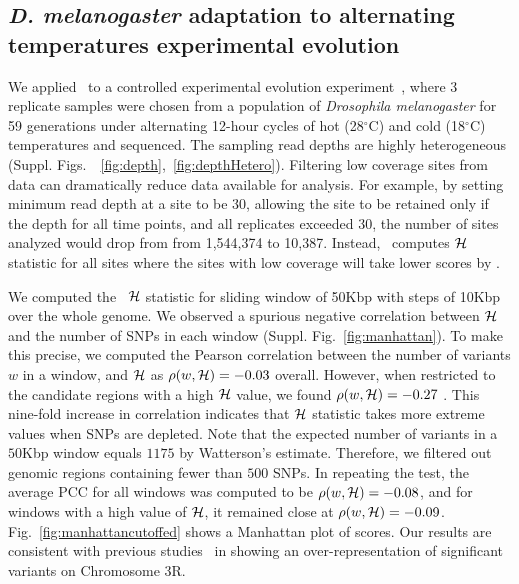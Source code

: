 \documentclass[11pt]{article}
\def\comale{\text{{\sc Comale}}}
\def\data{\emph{D. melanogaster} adaptation to alternating temperatures 
experimental evolution}
\begin{document}
\subsection{\data}\label{sec:dmel}
We applied \comale\ to a controlled experimental evolution
experiment~\cite{orozco2012adaptation}, where $3$ replicate samples
were chosen from a population of \emph{Drosophila melanogaster} for 59
generations under alternating 12-hour cycles of hot (28$^{\circ}$C)
and cold (18$^{\circ}$C) temperatures and sequenced. The sampling read
depths are highly heterogeneous
(Suppl. Figs.~~\ref{fig:depth},~\ref{fig:depthHetero}). Filtering low
coverage sites from data can dramatically reduce data available for
analysis. For example, by setting minimum read depth at a site to be
$30$, allowing the site to be retained only if the depth for all time
points, and all replicates exceeded $30$, the number of sites analyzed
would drop from from 1,544,374 to 10,387. Instead, \comale\ computes
${\cal H}$ statistic for all sites where the sites with low coverage will
take lower scores by \comale.

We computed the \comale\ ${\cal H}$ statistic for sliding
window of 50Kbp with steps of 10Kbp over the whole genome. We observed
a spurious negative correlation between ${\cal H}$ and the number of SNPs
in each window (Suppl. Fig.~\ref{fig:manhattan}). To make this
precise, we computed the Pearson correlation between the number of
variants $w$ in a window, and ${\cal H}$ as $\rho(w,{\cal H})=-0.03$
overall. However, when restricted to the candidate regions with a high
${\cal H}$ value, we found $\rho(w,{\cal H})=-0.27$ . This nine-fold increase in
correlation indicates that ${\cal H}$ statistic takes more extreme values
when SNPs are depleted. Note that the expected number of variants in a
$50$Kbp window equals $1175$ by Watterson's estimate. Therefore, we
filtered out genomic regions containing fewer than $500$ SNPs. In
repeating the test, the average PCC for all windows was computed to be
$\rho(w,{\cal H})=-0.08$, and for windows with a high value of ${\cal H}$, it
remained close at
$\rho(w,{\cal H})=-0.09$. Fig.~\ref{fig:manhattancutoffed} shows a
Manhattan plot of scores. Our results are consistent with previous
studies~\cite{orozco2012adaptation} in showing an over-representation
of significant variants on Chromosome 3R.
\end{document}
